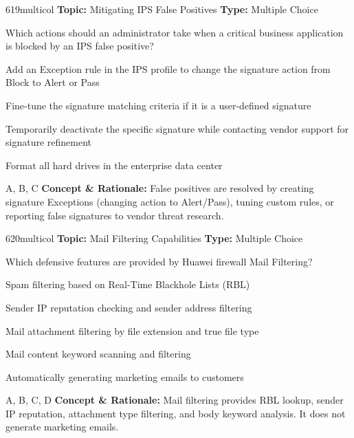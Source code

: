 \begin{qcard}{619}{multicol}
\textcolor{darkslate!75}{\small\textbf{Topic:} Mitigating IPS False Positives \hfill \textbf{Type:} Multiple Choice}\vspace{0.4em}\par
Which actions should an administrator take when a critical business application is blocked by an IPS false positive?
\begin{qoptions}
\item Add an Exception rule in the IPS profile to change the signature action from Block to Alert or Pass
\item Fine-tune the signature matching criteria if it is a user-defined signature
\item Temporarily deactivate the specific signature while contacting vendor support for signature refinement
\item Format all hard drives in the enterprise data center
\end{qoptions}
\end{qcard}
\nopagebreak
\begin{explainbox}{A, B, C}
\textbf{Concept \& Rationale:} False positives are resolved by creating signature Exceptions (changing action to Alert/Pass), tuning custom rules, or reporting false signatures to vendor threat research.
\end{explainbox}

\begin{qcard}{620}{multicol}
\textcolor{darkslate!75}{\small\textbf{Topic:} Mail Filtering Capabilities \hfill \textbf{Type:} Multiple Choice}\vspace{0.4em}\par
Which defensive features are provided by Huawei firewall Mail Filtering?
\begin{qoptions}
\item Spam filtering based on Real-Time Blackhole Lists (RBL)
\item Sender IP reputation checking and sender address filtering
\item Mail attachment filtering by file extension and true file type
\item Mail content keyword scanning and filtering
\item Automatically generating marketing emails to customers
\end{qoptions}
\end{qcard}
\nopagebreak
\begin{explainbox}{A, B, C, D}
\textbf{Concept \& Rationale:} Mail filtering provides RBL lookup, sender IP reputation, attachment type filtering, and body keyword analysis. It does not generate marketing emails.
\end{explainbox}

